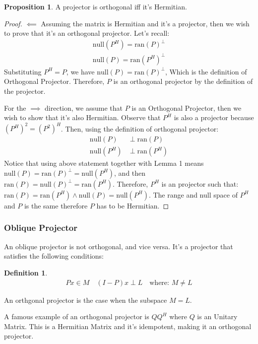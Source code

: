 \documentclass[]{article}
\theoremstyle{definition}
\newtheorem{prop}{Proposition}
\newtheorem{definition}{Definition}
\begin{document}
            \begin{prop}
                A projector is orthogonal iff it's Hermitian. 
            \end{prop}
            \begin{proof}
                $\impliedby$ Assuming the matrix is Hermitian and it's a projector, then we wish to prove that it's an orthogonal projector. Let's recall: 
                \begin{align}
                    \text{null}(P^H) = \text{ran}(P)^{\perp}
                    \\
                    \text{null}(P) = \text{ran}(P^H)^{\perp}
                \end{align}
                Substituting $P^H = P$, we have $\text{null}(P) = \text{ran}(P)^{\perp}$, Which is the definition of Orthogonal Projector. Therefore, $P$ is an orthogonal projector by the definition of the projector. 
                \par
                For the $\implies$ direction, we assume that $P$ is an Orthogonal Projector, then we wish to show that it's also Hermitian. Observe that $P^H$ is also a projector because $(P^H)^2 = (P^2)^H$. Then, using the definition of orthogonal projector: 
                \begin{align}
                    \text{null}(P) &\perp\text{ran}(P) 
                    \\
                    \text{null}(P^H) &\perp \text{ran}(P^H)
                \end{align}
                Notice that using above statement together with Lemma 1 means $\text{null}(P) = \text{ran}(P)^\perp = \text{null}(P^H)$, and then $\text{ran}(P)=\text{null}(P)^\perp = \text{ran}(P^H)$. Therefore, $P^H$ is an projector such that: $\text{ran}(P) = \text{ran}(P^H) \wedge \text{null}(P) = \text{null}(P^H)$. The range and null space of $P^H$ and $P$ is the same therefore $P$ has to be Hermitian. 
            \end{proof}
            \subsubsection{Oblique Projector}
                An oblique projector is not orthogonal, and vice versa. It's a projector that satisfies the following conditions: 
                \begin{definition}
                    \begin{align}
                        Px \in M \quad (I - P)x \perp L \quad \text{where: } M \neq L
                    \end{align}    
                \end{definition}
                An orthgonal projector is the case when the subspace $M = L$. 
                \par
                A famous example of an orthogonal projector is $QQ^H$ where $Q$ is an Unitary Matrix. This is a Hermitian Matrix and it's idempotent, making it an orthogonal projector. 
\end{document}
